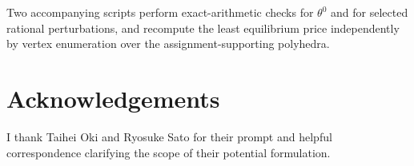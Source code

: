 Two accompanying scripts perform exact-arithmetic checks for $\theta^0$ and for selected rational perturbations, and recompute the least equilibrium price independently by vertex enumeration over the assignment-supporting polyhedra.

\section*{Acknowledgements}

I thank Taihei Oki and Ryosuke Sato for their prompt and helpful correspondence clarifying the scope of their potential formulation.





